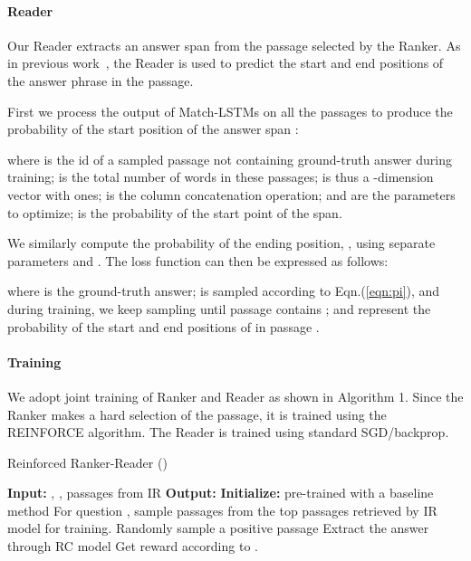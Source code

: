 \documentclass[letterpaper]{article} \usepackage{aaai18}  \usepackage{times}  \usepackage{helvet}  \usepackage{courier}  \usepackage{url}  \usepackage{graphicx}  \usepackage{comment}
\begin{document}
\paragraph{Reader}
Our Reader extracts an answer span from the passage  selected by the Ranker. As in previous work~\cite{wang2016machine,xiong2016dynamic,seo2016bidirectional,wang2017gated}, the Reader is used to predict the start and end positions of the answer phrase in the passage.

First we process the output of Match-LSTMs on all the passages to produce the probability of the start position of the answer span :

where  is the id of a sampled passage not containing ground-truth answer during training;
 is the total number of words in these passages;  is thus a -dimension vector with ones;  is the column concatenation operation;  and  are the parameters to optimize;  is the probability of the start point of the span.

We similarly compute the probability of the ending position, , using separate parameters  and .
The loss function can then be expressed as follows:

where  is the ground-truth answer;  is sampled according to Eqn.(\ref{eqn:pi}), and during training, we keep sampling until passage  contains ;  and  represent the probability of the start and end positions of  in passage . 

\paragraph{Training}

We adopt joint training of Ranker and Reader as shown in Algorithm 1.  Since the Ranker makes a hard selection of the passage, it is trained using the REINFORCE algorithm. The Reader is trained using standard
SGD/backprop.


\begin{algorithm}
	\label{algorithm:alg1}
    \caption{Reinforced Ranker-Reader ()}
  \begin{algorithmic}[1]
\State \textbf{Input: }, , passages from IR
    \State \textbf{Output:}  
    \State \textbf{Initialize:}
      pre-trained  with a baseline method\footnotemark
      \STATE For question , sample  passages from the top  passages retrieved by IR model for training. \footnotemark
\STATE Randomly sample a positive passage 
      \STATE Extract the answer  through RC model
      \STATE Get reward  according to .
	\ENDFOR
  \end{algorithmic}
\end{algorithm}
 \addtocounter{footnote}{-2} 
\end{document}
